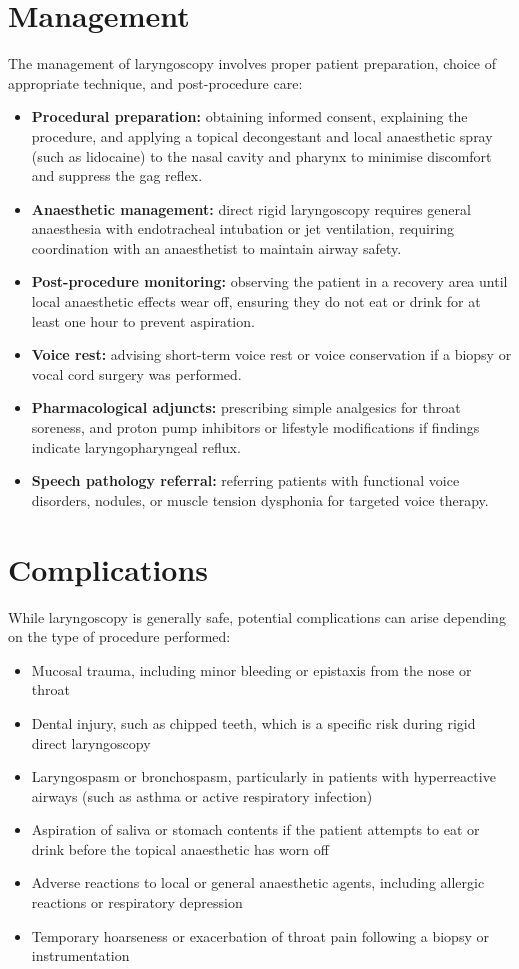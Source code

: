 \section*{Management}
The management of laryngoscopy involves proper patient preparation, choice of appropriate technique, and post-procedure care:
\begin{itemize}
    \item \textbf{Procedural preparation:} obtaining informed consent, explaining the procedure, and applying a topical decongestant and local anaesthetic spray (such as lidocaine) to the nasal cavity and pharynx to minimise discomfort and suppress the gag reflex.
    \item \textbf{Anaesthetic management:} direct rigid laryngoscopy requires general anaesthesia with endotracheal intubation or jet ventilation, requiring coordination with an anaesthetist to maintain airway safety.
    \item \textbf{Post-procedure monitoring:} observing the patient in a recovery area until local anaesthetic effects wear off, ensuring they do not eat or drink for at least one hour to prevent aspiration.
    \item \textbf{Voice rest:} advising short-term voice rest or voice conservation if a biopsy or vocal cord surgery was performed.
    \item \textbf{Pharmacological adjuncts:} prescribing simple analgesics for throat soreness, and proton pump inhibitors or lifestyle modifications if findings indicate laryngopharyngeal reflux.
    \item \textbf{Speech pathology referral:} referring patients with functional voice disorders, nodules, or muscle tension dysphonia for targeted voice therapy.
\end{itemize}

\section*{Complications}
While laryngoscopy is generally safe, potential complications can arise depending on the type of procedure performed:
\begin{itemize}
    \item Mucosal trauma, including minor bleeding or epistaxis from the nose or throat
    \item Dental injury, such as chipped teeth, which is a specific risk during rigid direct laryngoscopy
    \item Laryngospasm or bronchospasm, particularly in patients with hyperreactive airways (such as asthma or active respiratory infection)
    \item Aspiration of saliva or stomach contents if the patient attempts to eat or drink before the topical anaesthetic has worn off
    \item Adverse reactions to local or general anaesthetic agents, including allergic reactions or respiratory depression
    \item Temporary hoarseness or exacerbation of throat pain following a biopsy or instrumentation
\end{itemize}

